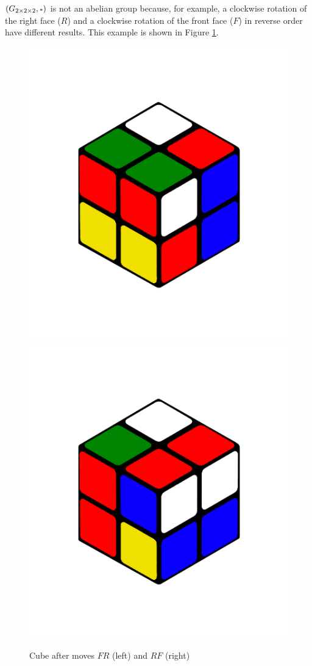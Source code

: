 \documentclass[12pt,a4paper]{article}
\theoremstyle{custom}
\newcommand{\Gtwo}{\ensuremath{G_{2\times 2\times 2}}}
\begin{document}
$(\Gtwo, \mathlarger{\scriptstyle*})$ is not an abelian group because, for example, a clockwise rotation of the right face ($R$) and a clockwise rotation of the front face ($F$) in reverse order have different results. This example is shown in Figure \ref{Figure_CubeAfterFRandRF}.
\begin{figure}[H]
\centering
\includegraphics[scale=0.1]{RF.png}
\includegraphics[scale=0.1]{FR.png}
\caption[Cube after moves $FR$ (left) and $RF$ (right)]{Cube after moves $FR$ (left) and $RF$ (right)}
\label{Figure_CubeAfterFRandRF}
\end{figure}
\end{document}
